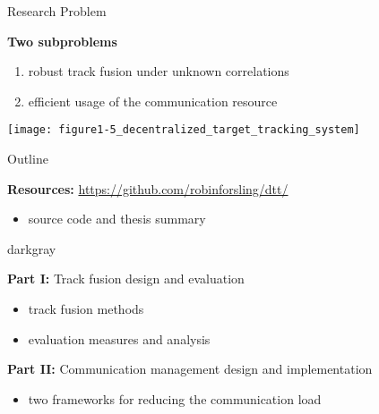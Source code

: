 \documentclass[aspectratio=1610]{beamer}
\begin{document}
\begin{frame}{Research Problem}

\textbf{Two subproblems}
\begin{enumerate}
    \item robust \alert{track fusion} under unknown correlations
    \item efficient usage of the  \alert{communication resource}
\end{enumerate}

\vspace{1em}

\begin{center}
    \texttt{[image: figure1-5\_decentralized\_target\_tracking\_system]}
\end{center}

\end{frame}


\begin{frame}{Outline}

\begin{small}

\textbf{Resources:} \alert{\url{https://github.com/robinforsling/dtt/}}
\begin{itemize}
    \item \matlab source code and thesis summary
\end{itemize}


\pause
\vspace{0.5em}

\begin{rfshadedcolorbox}[title={Outline}]{darkgray}

\textbf{Part I:} Track fusion design and evaluation
\begin{itemize}
    \item track fusion methods
    \item evaluation measures and analysis
\end{itemize}

\textbf{Part II:} Communication management design and implementation
\begin{itemize}
    \item two frameworks for reducing the communication load
\end{itemize}

\end{rfshadedcolorbox}
\end{small}

\end{frame}
\end{document}
